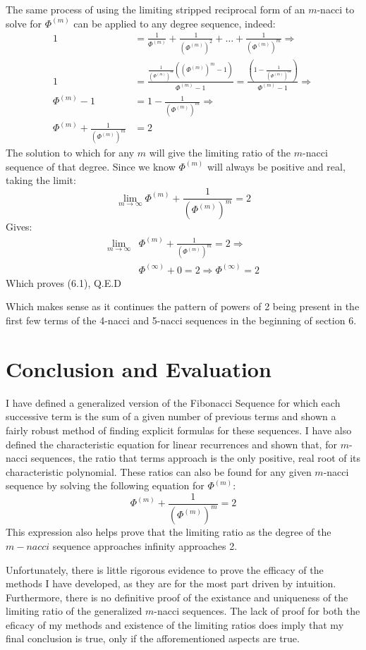 \documentclass[11pt]{article}
\begin{document}
The same process of using the limiting stripped reciprocal form of an \(m\)-nacci to solve for \(\Phi^{(m)}\) can be applied to any degree sequence, indeed:
\begin{align*}
    1&=\frac{1}{\Phi^{(m)}}+\frac{1}{(\Phi^{(m)})^2}+\dots+\frac{1}{(\Phi^{(m)})^m} \Rightarrow \\
    1&=\frac{\frac{1}{(\Phi^{(m)})^m}((\Phi^{(m)})^m-1)}{\Phi^{(m)}-1}=\frac{(1-\frac{1}{(\Phi^{(m)})^m})}{\Phi^{(m)}-1} \Rightarrow \\
    \Phi^{(m)}-1&=1-\frac{1}{(\Phi^{(m)})^m} \Rightarrow \\
    \Phi^{(m)}+\frac{1}{(\Phi^{(m)})^m}&=2
\end{align*}
The solution to which for any \(m\) will give the limiting ratio of the \(m\)-nacci sequence of that degree.
Since we know \(\Phi^{(m)}\) will always be positive and real, taking the limit:
\[\lim_{m\to\infty}\Phi^{(m)}+\frac{1}{(\Phi^{(m)})^m}=2\]
Gives:
\begin{align*}
    \lim_{m\to\infty}&\Phi^{(m)}+\frac{1}{(\Phi^{(m)})^m}=2 \Rightarrow \\
    &\Phi^{(\infty)}+0=2 \Rightarrow \Phi^{(\infty)}=2
\end{align*}
Which proves (6.1), Q.E.D

Which makes sense as it continues the pattern of powers of 2 being present in the first few terms of the 4-nacci and 5-nacci sequences in the beginning of section 6. 


\section{Conclusion and Evaluation}
I have defined a generalized version of the Fibonacci Sequence for which each successive term is the sum of a given number of previous terms and shown a fairly robust method of finding explicit formulas for these sequences. I have also defined the characteristic equation for linear recurrences and shown that, for \(m\)-nacci sequences, the ratio that terms approach is the only positive, real root of its characteristic polynomial. 
These ratios can also be found for any given \(m\)-nacci sequence by solving the following equation for \(\Phi^{(m)}\):
\[\Phi^{(m)}+\frac{1}{(\Phi^{(m)})^m}=2\]
This expression also helps prove that the limiting ratio as the degree of the \(m-nacci\) sequence approaches infinity approaches 2.

Unfortunately, there is little rigorous evidence to prove the efficacy of the methods I have developed, as they are for the most part driven by intuition. Furthermore, there is no definitive proof of the existance and uniqueness of the limiting ratio of the generalized \(m\)-nacci sequences. The lack of proof for both the eficacy of my methods and existence of the limiting ratios does imply that my final conclusion is true, only if the afforementioned aspects are true. 
\end{document}
